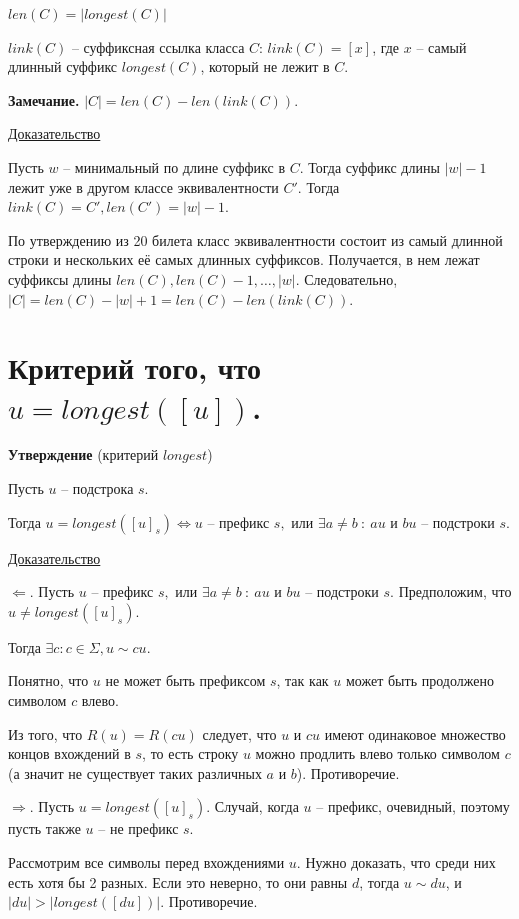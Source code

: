$len(C) = |longest(C)|$

$link(C)$ -- суффиксная ссылка класса $C$: $link(C) = [x]$, где $x$ -- самый длинный суффикс $longest(C)$, который не лежит в $C$.

\textbf{Замечание.} $|C| = len(C) - len(link(C))$.

\underline{Доказательство}

Пусть $w$ -- минимальный по длине суффикс в $C$. Тогда суффикс длины $|w| - 1$ лежит уже в другом классе эквивалентности $C'$. Тогда $link(C) = C', len(C') = |w| - 1$.

По утверждению из 20 билета класс эквивалентности состоит из самый длинной строки и нескольких её самых длинных суффиксов. Получается, в нем лежат суффиксы длины $len(C), len(C) - 1, \ldots, |w|$. Следовательно, 
$|C| = len(C) - |w| + 1 = len(C) - len(link(C))$.

\newpage{}

\section{Критерий того, что $u = longest([u])$.}

\textbf{Утверждение} (критерий $longest$)

Пусть $u$ -- подстрока $s$.

Тогда $u = longest([u]_s) \Leftrightarrow u \text{ -- префикс } s, 
\text{ или } \exists a \neq b\ :\ au \text{ и } bu \text{ -- подстроки } s$.

\underline{Доказательство}

$\Leftarrow$. Пусть $u \text{ -- префикс } s, 
\text{ или } \exists a \neq b\ :\ au \text{ и } bu \text{ -- подстроки } s$. Предположим, что $u \neq longest([u]_s)$.

Тогда $\exists c : c \in \Sigma, u \sim cu$.

Понятно, что $u$ не может быть префиксом $s$, так как $u$ может быть продолжено символом $c$ влево.

Из того, что $R(u) = R(cu)$ следует, что $u$ и $cu$ имеют одинаковое множество концов вхождений в $s$, то есть строку $u$ можно продлить влево только символом $c$ (а значит не существует таких различных $a$ и $b$). Противоречие.

$\Rightarrow$. Пусть $u = longest([u]_s)$. Случай, когда $u$ -- префикс, очевидный, поэтому пусть также $u$ -- не префикс $s$.

Рассмотрим все символы перед вхождениями $u$. Нужно доказать, что среди них есть хотя бы 2 разных. Если это неверно, то они равны $d$, тогда $u \sim du$, и $|du| > |longest([du])|$. Противоречие.

